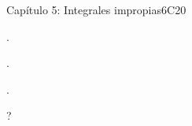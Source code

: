 \begin{syllabus}
\begin{unit}{Capítulo 5: Integrales impropias}{}{}{6}{C20}
   \begin{learningoutcomes}
      \item .
      \item .
      \item .
   \end{learningoutcomes}   
\end{unit}

\begin{coursebibliography}
\end{coursebibliography}

?

\end{syllabus}
